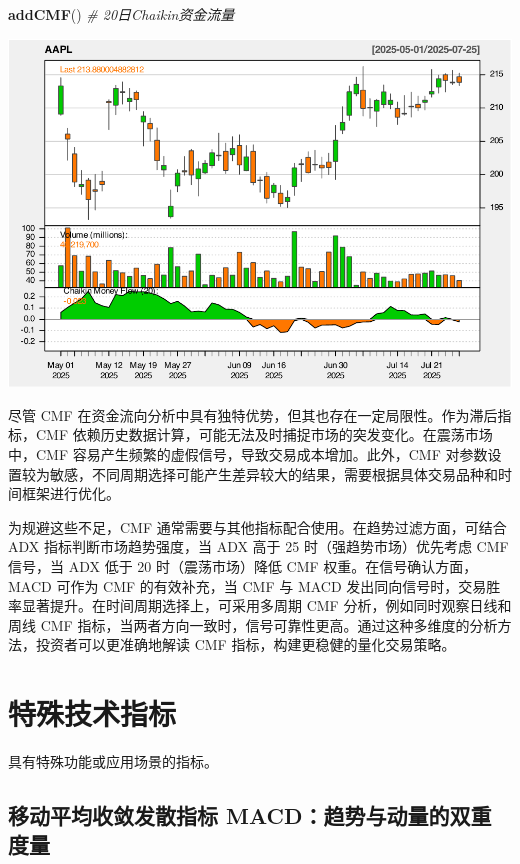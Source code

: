\documentclass[]{ctexbook}
\newenvironment{Shaded}{\begin{snugshade}}{\end{snugshade}}
\newcommand{\CommentTok}[1]{\textcolor[rgb]{0.56,0.35,0.01}{\textit{#1}}}
\newcommand{\FunctionTok}[1]{\textcolor[rgb]{0.13,0.29,0.53}{\textbf{#1}}}
\newcommand{\NormalTok}[1]{#1}
\begin{document}
\begin{Shaded}
\begin{Highlighting}[]
\FunctionTok{addCMF}\NormalTok{()  }\CommentTok{\# 20日Chaikin资金流量}
\end{Highlighting}
\end{Shaded}

\includegraphics[width=0.9\linewidth]{QuantmodHandbook_files/figure-latex/cmf-2}

尽管 CMF 在资金流向分析中具有独特优势，但其也存在一定局限性。作为滞后指标，CMF 依赖历史数据计算，可能无法及时捕捉市场的突发变化。在震荡市场中，CMF 容易产生频繁的虚假信号，导致交易成本增加。此外，CMF 对参数设置较为敏感，不同周期选择可能产生差异较大的结果，需要根据具体交易品种和时间框架进行优化。

为规避这些不足，CMF 通常需要与其他指标配合使用。在趋势过滤方面，可结合 ADX 指标判断市场趋势强度，当 ADX 高于 25 时（强趋势市场）优先考虑 CMF 信号，当 ADX 低于 20 时（震荡市场）降低 CMF 权重。在信号确认方面，MACD 可作为 CMF 的有效补充，当 CMF 与 MACD 发出同向信号时，交易胜率显著提升。在时间周期选择上，可采用多周期 CMF 分析，例如同时观察日线和周线 CMF 指标，当两者方向一致时，信号可靠性更高。通过这种多维度的分析方法，投资者可以更准确地解读 CMF 指标，构建更稳健的量化交易策略。

\section{特殊技术指标}\label{ux7279ux6b8aux6280ux672fux6307ux6807}

具有特殊功能或应用场景的指标。

\subsection{移动平均收敛发散指标 MACD：趋势与动量的双重度量}\label{ux79fbux52a8ux5e73ux5747ux6536ux655bux53d1ux6563ux6307ux6807-macdux8d8bux52bfux4e0eux52a8ux91cfux7684ux53ccux91cdux5ea6ux91cf}
\end{document}
